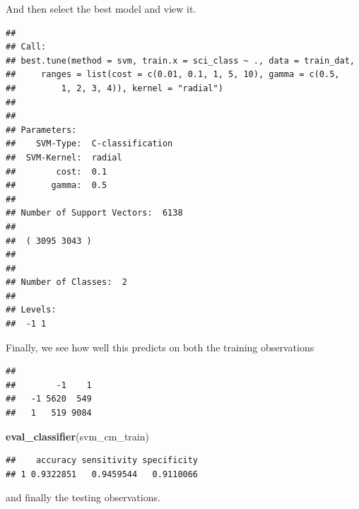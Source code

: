 \documentclass[]{book}
\newenvironment{Shaded}{\begin{snugshade}}{\end{snugshade}}
\newcommand{\DataTypeTok}[1]{\textcolor[rgb]{0.13,0.29,0.53}{#1}}
\newcommand{\KeywordTok}[1]{\textcolor[rgb]{0.13,0.29,0.53}{\textbf{#1}}}
\newcommand{\NormalTok}[1]{#1}
\newcommand{\OperatorTok}[1]{\textcolor[rgb]{0.81,0.36,0.00}{\textbf{#1}}}
\newcommand{\StringTok}[1]{\textcolor[rgb]{0.31,0.60,0.02}{#1}}
\begin{document}
And then select the best model and view it.

\begin{Shaded}
\end{Shaded}

\begin{verbatim}
## 
## Call:
## best.tune(method = svm, train.x = sci_class ~ ., data = train_dat, 
##     ranges = list(cost = c(0.01, 0.1, 1, 5, 10), gamma = c(0.5, 
##         1, 2, 3, 4)), kernel = "radial")
## 
## 
## Parameters:
##    SVM-Type:  C-classification 
##  SVM-Kernel:  radial 
##        cost:  0.1 
##       gamma:  0.5 
## 
## Number of Support Vectors:  6138
## 
##  ( 3095 3043 )
## 
## 
## Number of Classes:  2 
## 
## Levels: 
##  -1 1
\end{verbatim}

Finally, we see how well this predicts on both the training observations

\begin{Shaded}
\end{Shaded}

\begin{verbatim}
##     
##        -1    1
##   -1 5620  549
##   1   519 9084
\end{verbatim}

\begin{Shaded}
\begin{Highlighting}[]
\KeywordTok{eval_classifier}\NormalTok{(svm_cm_train)}
\end{Highlighting}
\end{Shaded}

\begin{verbatim}
##    accuracy sensitivity specificity
## 1 0.9322851   0.9459544   0.9110066
\end{verbatim}

and finally the testing observations.

\begin{Shaded}
\end{Shaded}
\end{document}
